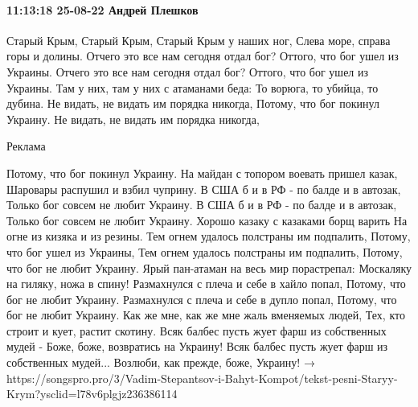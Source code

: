  
 
 
 
 

\paragraph{11:13:18 25-08-22 Андрей Плешков}

Старый Крым, Старый Крым, Старый Крым у наших ног,
Слева море, справа горы и долины.
Отчего это все нам сегодня отдал бог?
Оттого, что бог ушел из Украины.
Отчего это все нам сегодня отдал бог?
Оттого, что бог ушел из Украины.
Там у них, там у них с атаманами беда:
То ворюга, то убийца, то дубина.
Не видать, не видать им порядка никогда,
Потому, что бог покинул Украину.
Не видать, не видать им порядка никогда,

Реклама

Потому, что бог покинул Украину.
На майдан с топором воевать пришел казак,
Шаровары распушил и взбил чуприну.
В США б и в РФ - по балде и в автозак,
Только бог совсем не любит Украину.
В США б и в РФ - по балде и в автозак,
Только бог совсем не любит Украину.
Хорошо казаку с казаками борщ варить
На огне из кизяка и из резины.
Тем огнем удалось полстраны им подпалить,
Потому, что бог ушел из Украины,
Тем огнем удалось полстраны им подпалить,
Потому, что бог не любит Украину.
Ярый пан-атаман на весь мир порастрепал:
Москаляку на гиляку, ножа в спину!
Размахнулся с плеча и себе в хайло попал,
Потому, что бог не любит Украину.
Размахнулся с плеча и себе в дупло попал,
Потому, что бог не любит Украину.
Как же мне, как же мне жаль вменяемых людей,
Тех, кто строит и кует, растит скотину.
Всяк балбес пусть жует фарш из собственных мудей -
Боже, боже, возвратись на Украину!
Всяк балбес пусть жует фарш из собственных мудей...
Возлюби, как прежде, боже, Украину!
→ https://songspro.pro/3/Vadim-Stepantsov-i-Bahyt-Kompot/tekst-pesni-Staryy-Krym?ysclid=l78v6plgjz236386114
